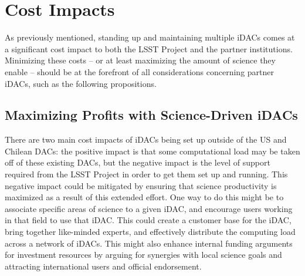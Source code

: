 \section{Cost Impacts}\label{sec:costs}

As previously mentioned, standing up and maintaining multiple iDACs comes at a significant cost impact to both the LSST Project and the partner institutions. Minimizing these costs -- or at least maximizing the amount of science they enable -- should be at the forefront of all considerations concerning partner iDACs, such as the following propositions.

\subsection{Maximizing Profits with Science-Driven iDACs}
There are two main cost impacts of iDACs being set up outside of the US and Chilean DACs: the positive impact is that some computational load may be taken off of these existing DACs, but the negative impact is the level of support required from the LSST Project in order to get them set up and running. This negative impact could be mitigated by ensuring that science productivity is maximized as a result of this extended effort. One way to do this might be to associate specific areas of science to a given iDAC, and encourage users working in that field to use that iDAC. This could create a customer base for the iDAC, bring together like-minded experts, and effectively distribute the computing load across a network of iDACs. This might also enhance internal funding arguments for investment resources by arguing for synergies with local science goals and attracting international users and official endorsement.



